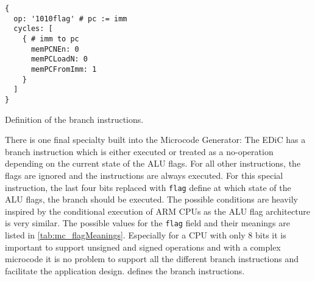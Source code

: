 \begin{listing}[h!]
  \begin{verbatim}
{
  op: '1010flag' # pc := imm
  cycles: [
    { # imm to pc
      memPCNEn: 0
      memPCLoadN: 0
      memPCFromImm: 1
    }
  ]
}
  \end{verbatim}
  \caption{Definition of the branch instructions.}
  \label{lst:mc_branch}
\end{listing}
There is one final specialty built into the Microcode Generator:
The \gls{EDiC} has a branch instruction which is either executed or treated as a no-operation depending on the current state of the \gls{ALU} flags.
For all other instructions, the flags are ignored and the instructions are always executed.
For this special instruction, the last four bits replaced with \texttt{flag} define at which state of the \gls{ALU} flags, the branch should be executed.
The possible conditions are heavily inspired by the conditional execution of ARM \glspl{CPU}\cite{armCond} as the \gls{ALU} flag architecture is very similar.
The possible values for the \texttt{flag} field and their meanings are listed in \cref{tab:mc_flagMeanings}.
Especially for a \gls{CPU} with only 8 bits it is important to support unsigned and signed operations and with a complex microcode it is no problem to support all the different branch instructions and facilitate the application design.
 defines the branch instructions.
